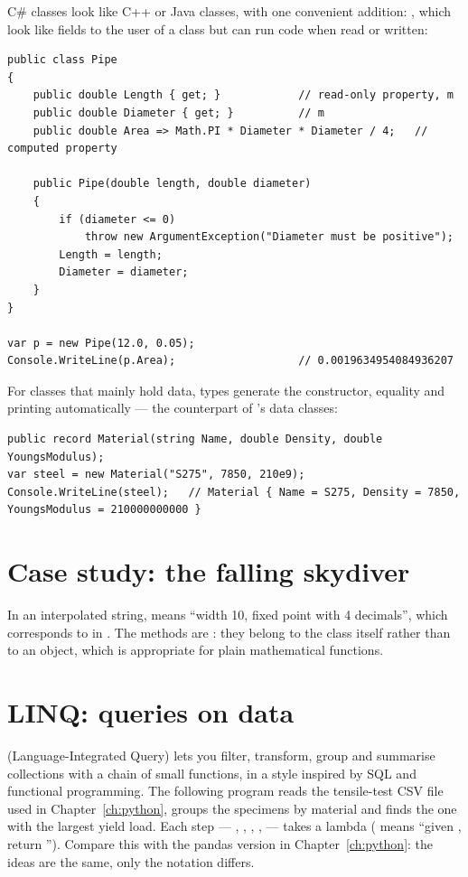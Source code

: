 C\# classes look like C++ or Java classes, with one convenient addition:
, which look like fields to the user of a class but can run code when
read or written:
\begin{lstlisting}[language={[Sharp]C}]
public class Pipe
{
    public double Length { get; }            // read-only property, m
    public double Diameter { get; }          // m
    public double Area => Math.PI * Diameter * Diameter / 4;   // computed property

    public Pipe(double length, double diameter)
    {
        if (diameter <= 0)
            throw new ArgumentException("Diameter must be positive");
        Length = length;
        Diameter = diameter;
    }
}

var p = new Pipe(12.0, 0.05);
Console.WriteLine(p.Area);                   // 0.0019634954084936207
\end{lstlisting}
For classes that mainly hold data,  types generate the constructor, equality
and printing automatically --- the counterpart of \py's data classes:
\begin{lstlisting}[language={[Sharp]C}]
public record Material(string Name, double Density, double YoungsModulus);
var steel = new Material("S275", 7850, 210e9);
Console.WriteLine(steel);   // Material { Name = S275, Density = 7850, YoungsModulus = 210000000000 }
\end{lstlisting}

\section{Case study: the falling skydiver}

In an interpolated string,  means ``width 10, fixed point with 4
decimals'', which corresponds to  in \py. The methods are
: they belong to the class itself rather than to an object, which is
appropriate for plain mathematical functions.

\section{LINQ: queries on data}

 (Language-Integrated Query) lets you filter, transform, group and summarise
collections with a chain of small functions, in a style inspired by SQL and functional
programming. The following program reads the tensile-test CSV file used in
Chapter~\ref{ch:python}, groups the specimens by material and finds the one with the
largest yield load.
Each step --- , , , ,
 --- takes a lambda ( means ``given ,
return ''). Compare this with the pandas version in
Chapter~\ref{ch:python}: the ideas are the same, only the notation differs.

